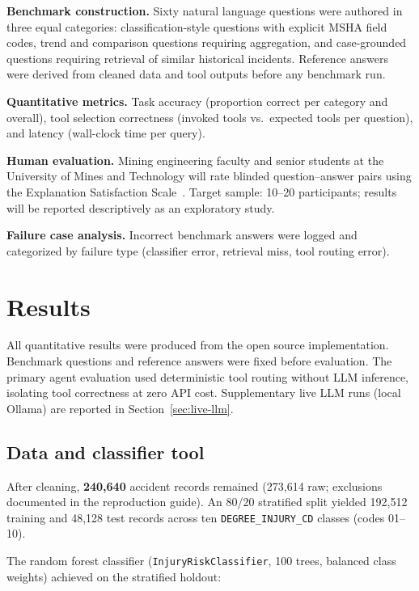 \documentclass[11pt,a4paper]{article}
\begin{document}
\textbf{Benchmark construction.} Sixty natural language questions were authored
in three equal categories: classification-style questions with explicit MSHA
field codes, trend and comparison questions requiring aggregation, and
case-grounded questions requiring retrieval of similar historical incidents.
Reference answers were derived from cleaned data and tool outputs before any
benchmark run.

\textbf{Quantitative metrics.} Task accuracy (proportion correct per category
and overall), tool selection correctness (invoked tools vs.\ expected tools
per question), and latency (wall-clock time per query).

\textbf{Human evaluation.} Mining engineering faculty and senior students at
the University of Mines and Technology will rate blinded question--answer pairs
using the Explanation Satisfaction Scale~\cite{Hoffman2023}. Target sample:
10--20 participants; results will be reported descriptively as an exploratory
study.

\textbf{Failure case analysis.} Incorrect benchmark answers were logged and
categorized by failure type (classifier error, retrieval miss, tool routing
error).

\section{Results}
\label{sec:results}

All quantitative results were produced from the open source implementation.
Benchmark questions and reference answers were fixed before evaluation. The
primary agent evaluation used deterministic tool routing without LLM inference,
isolating tool correctness at zero API cost. Supplementary live LLM runs
(local Ollama) are reported in Section~\ref{sec:live-llm}.

\subsection{Data and classifier tool}

After cleaning, \textbf{240{,}640} accident records remained (273{,}614 raw;
exclusions documented in the reproduction guide). An 80/20 stratified split
yielded 192{,}512 training and 48{,}128 test records across ten
\texttt{DEGREE\_INJURY\_CD} classes (codes 01--10).

The random forest classifier (\texttt{InjuryRiskClassifier}, 100 trees,
balanced class weights) achieved on the stratified holdout:
\end{document}
